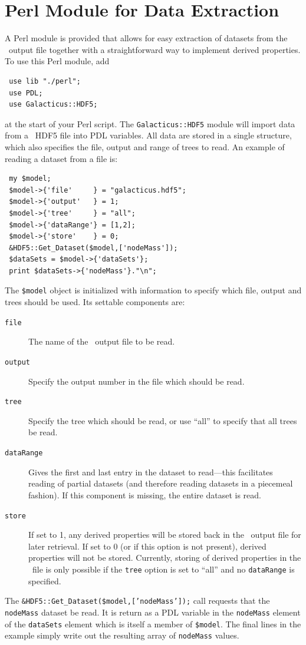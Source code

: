\section{Perl Module for Data Extraction}\label{sec:perlModuleDataExtraction}

A Perl module is provided that allows for easy extraction of datasets from the \glc\ output file together with a straightforward way to implement derived properties. To use this Perl module, add
\begin{verbatim}
 use lib "./perl";
 use PDL;
 use Galacticus::HDF5;
\end{verbatim}
at the start of your Perl script. The {\tt Galacticus::HDF5} module will import data from a \glc\ HDF5 file into PDL variables. All data are stored in a single structure, which also specifies the file, output and range of trees to read. An example of reading a dataset from a file is:
\begin{verbatim}
 my $model;
 $model->{'file'     } = "galacticus.hdf5";
 $model->{'output'   } = 1;
 $model->{'tree'     } = "all";
 $model->{'dataRange'} = [1,2];
 $model->{'store'    } = 0;
 &HDF5::Get_Dataset($model,['nodeMass']);
 $dataSets = $model->{'dataSets'};
 print $dataSets->{'nodeMass'}."\n";
\end{verbatim}
The {\tt \$model} object is initialized with information to specify which file, output and trees should be used. Its settable components are:
\begin{description}
 \item [{\tt file}] The name of the \glc\ output file to be read.
 \item [{\tt output}] Specify the output number in the file which should be read.
 \item [{\tt tree}] Specify the tree which should be read, or use ``all'' to specify that all trees be read.
 \item [{\tt dataRange}] Gives the first and last entry in the dataset to read---this facilitates reading of partial datasets (and therefore reading datasets in a piecemeal fashion). If this component is missing, the entire dataset is read.
 \item[{\tt store}] If set to 1, any derived properties will be stored back in the \glc\ output file for later retrieval. If set to 0 (or if this option is not present), derived properties will not be stored. Currently, storing of derived properties in the \glc\ file is only possible if the {\tt tree} option is set to ``all'' and no {\tt dataRange} is specified.
\end{description}
The {\tt \&HDF5::Get\_Dataset(\$model,['nodeMass']);} call requests that the {\tt nodeMass} dataset be read. It is return as a PDL variable in the {\tt nodeMass} element of the {\tt dataSets} element which is itself a member of {\tt \$model}. The final lines in the example simply write out the resulting array of {\tt nodeMass} values.

